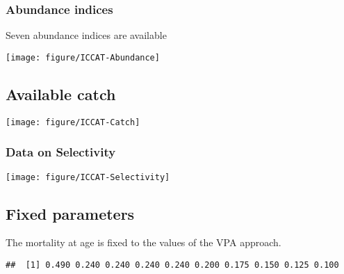 \documentclass[a4paper]{article}\usepackage{graphicx, color}
\makeatletter
\def\maxwidth{ %
  \ifdim\Gin@nat@width>\linewidth
    \linewidth
  \else
    \Gin@nat@width
  \fi
}
\newenvironment{kframe}{%
 \def\at@end@of@kframe{}%
 \ifinner\ifhmode%
  \def\at@end@of@kframe{\end{minipage}}%
  \begin{minipage}{\columnwidth}%
 \fi\fi%
 \def\FrameCommand##1{\hskip\@totalleftmargin \hskip-\fboxsep
 \colorbox{shadecolor}{##1}\hskip-\fboxsep
     \hskip-\linewidth \hskip-\@totalleftmargin \hskip\columnwidth}%
 \MakeFramed {\advance\hsize-\width
   \@totalleftmargin\z@ \linewidth\hsize
   \@setminipage}}%
 {\par\unskip\endMakeFramed%
 \at@end@of@kframe}
\newenvironment{knitrout}{}{} %
\makeatother
\begin{document}
\subsubsection{Abundance indices}
Seven abundance indices are available 
\begin{knitrout}
\color{fgcolor}

{\centering \texttt{[image: figure/ICCAT-Abundance]} 

}



\end{knitrout}

\subsection{Available catch}
\begin{knitrout}
\color{fgcolor}

{\centering \texttt{[image: figure/ICCAT-Catch]} 

}



\end{knitrout}

\subsubsection{Data on Selectivity}

\begin{knitrout}
\color{fgcolor}

{\centering \texttt{[image: figure/ICCAT-Selectivity]} 

}



\end{knitrout}

   
\subsection{Fixed parameters}
The mortality at age is fixed to the values of the VPA approach.
\begin{knitrout}
\color{fgcolor}\begin{kframe}
\begin{verbatim}
##  [1] 0.490 0.240 0.240 0.240 0.240 0.200 0.175 0.150 0.125 0.100
\end{verbatim}
\end{kframe}
\end{knitrout}
\end{document}
